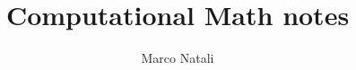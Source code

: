 \documentclass[a4paper, openany]{book}
\theoremstyle{definition}%
\begin{document}
    \title{Computational Math notes}
    \author{Marco Natali}
    \date{}
    \maketitle 
  
    \tableofcontents
    \listoffigures

    
    
    

    \printbibliography
\end{document}
